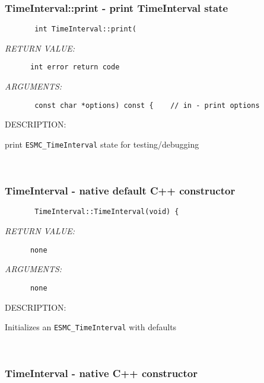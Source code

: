 \subsubsection [TimeInterval::print] {TimeInterval::print - print TimeInterval state}


  
\begin{verbatim}       int TimeInterval::print(\end{verbatim}{\em RETURN VALUE:}
\begin{verbatim}      int error return code\end{verbatim}{\em ARGUMENTS:}
\begin{verbatim}       const char *options) const {    // in - print options\end{verbatim}
{\sf DESCRIPTION:\\ }


        print {\tt ESMC\_TimeInterval} state for testing/debugging
   
 
\mbox{}\hrulefill\ 
 
\subsubsection [TimeInterval] {TimeInterval - native default C++ constructor}


  
\begin{verbatim}       TimeInterval::TimeInterval(void) {\end{verbatim}{\em RETURN VALUE:}
\begin{verbatim}      none\end{verbatim}{\em ARGUMENTS:}
\begin{verbatim}      none\end{verbatim}
{\sf DESCRIPTION:\\ }


        Initializes an {\tt ESMC\_TimeInterval} with defaults
   
 
\mbox{}\hrulefill\ 
 
\subsubsection [TimeInterval] {TimeInterval - native C++ constructor}



